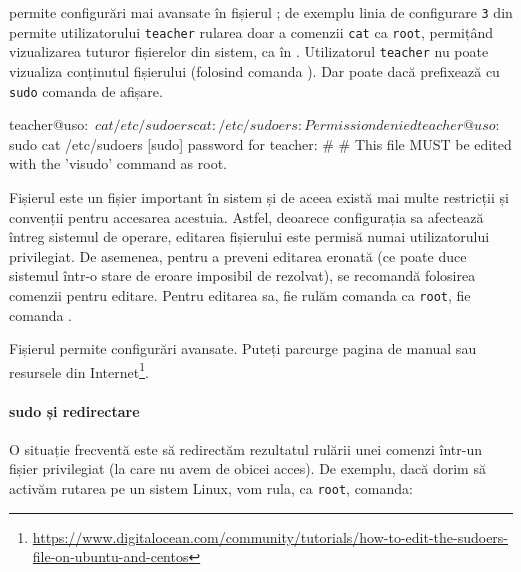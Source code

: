 permite configurări mai avansate în fișierul ;
de exemplu linia de configurare \texttt{3} din  permite utilizatorului \texttt{teacher} rularea doar a comenzii \texttt{cat} ca \texttt{root}, permițând vizualizarea tuturor fișierelor din sistem, ca în .
Utilizatorul \texttt{teacher} nu poate vizualiza conținutul fișierului  (folosind comanda ).
Dar poate dacă prefixează cu \texttt{sudo} comanda de afișare.

\begin{screen}[caption={Rularea unei comenzi privilegiate cu sudo},label={lst:user:sudo-command}]
teacher@uso:~$ cat /etc/sudoers
cat: /etc/sudoers: Permission denied
teacher@uso:~$ sudo cat /etc/sudoers
[sudo] password for teacher:
#
# This file MUST be edited with the 'visudo' command as root.
\end{screen}

Fișierul  este un fișier important în sistem și de aceea există mai multe restricții și convenții pentru accesarea acestuia.
Astfel, deoarece configurația sa afectează întreg sistemul de operare, editarea fișierului este permisă numai utilizatorului privilegiat.
De asemenea, pentru a preveni editarea eronată (ce poate duce sistemul într-o stare de eroare imposibil de rezolvat), se recomandă folosirea comenzii  pentru editare.
Pentru editarea sa, fie rulăm comanda  ca \texttt{root}, fie comanda .

\begin{note}
  Fișierul  permite configurări avansate.
  Puteți parcurge pagina de manual  sau resursele din Internet\footnote{\url{https://www.digitalocean.com/community/tutorials/how-to-edit-the-sudoers-file-on-ubuntu-and-centos}}.
\end{note}

\paragraph{sudo și redirectare}

O situație frecventă este să redirectăm rezultatul rulării unei comenzi într-un fișier privilegiat (la care nu avem de obicei acces).
De exemplu, dacă dorim să activăm rutarea pe un sistem Linux, vom rula, ca \texttt{root}, comanda:



